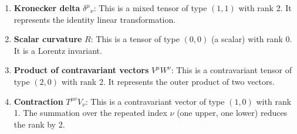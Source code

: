 \begin{enumerate}[label=(\alph*)]
  \item \textbf{Kronecker delta } $\delta^\mu{}_\nu$: This is a mixed tensor of type $(1,1)$ with rank 2. It represents the identity linear transformation.
  
  \item \textbf{Scalar curvature } $R$: This is a tensor of type $(0,0)$ (a scalar) with rank 0. It is a Lorentz invariant.
  
  \item \textbf{Product of contravariant vectors} $V^\mu W^\nu$: This is a contravariant tensor of type $(2,0)$ with rank 2. It represents the outer product of two vectors.
  
  \item \textbf{Contraction } $T^{\mu\nu} V_\nu$: This is a contravariant vector of type $(1,0)$ with rank 1. The summation over the repeated index $\nu$ (one upper, one lower) reduces the rank by 2.
\end{enumerate}


